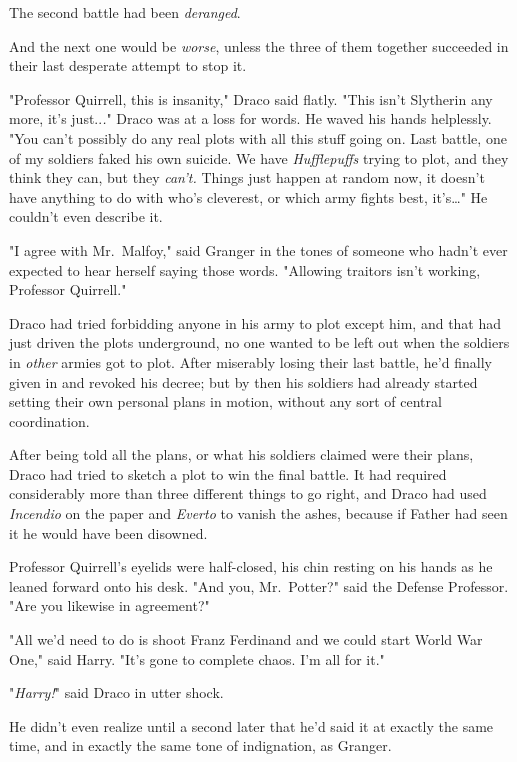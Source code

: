 The second battle had been \emph{deranged}.

And the next one would be \emph{worse}, unless the three of them together 
succeeded in their last desperate attempt to stop it.

"Professor Quirrell, this is insanity," Draco said flatly. "This isn't 
Slytherin any more, it's just..\emph{.}" Draco was at a loss for words. He 
waved his hands helplessly. "You can't possibly do any real plots with all this 
stuff going on. Last battle, one of my soldiers faked his own suicide. We have 
\emph{Hufflepuffs} trying to plot, and they think they can, but they 
\emph{can't.} Things just happen at random now, it doesn't have anything to do 
with who's cleverest, or which army fights best, it's{\ldots}" He couldn't even 
describe it.

"I agree with Mr.~Malfoy," said Granger in the tones of someone who hadn't ever 
expected to hear herself saying those words. "Allowing traitors isn't working, 
Professor Quirrell."

Draco had tried forbidding anyone in his army to plot except him, and that had 
just driven the plots underground, no one wanted to be left out when the 
soldiers in \emph{other} armies got to plot. After miserably losing their last 
battle, he'd finally given in and revoked his decree; but by then his soldiers 
had already started setting their own personal plans in motion, without any 
sort of central coordination.

After being told all the plans, or what his soldiers claimed were their plans, 
Draco had tried to sketch a plot to win the final battle. It had required 
considerably more than three different things to go right, and Draco had used 
\emph{Incendio} on the paper and \emph{Everto} to vanish the ashes, because if 
Father had seen it he would have been disowned.

Professor Quirrell's eyelids were half-closed, his chin resting on his hands as 
he leaned forward onto his desk. "And you, Mr.~Potter?" said the Defense 
Professor. "Are you likewise in agreement?"

"All we'd need to do is shoot Franz Ferdinand and we could start World War 
One," said Harry. "It's gone to complete chaos. I'm all for it."

"\emph{Harry!}" said Draco in utter shock.

He didn't even realize until a second later that he'd said it at exactly the 
same time, and in exactly the same tone of indignation, as Granger.

